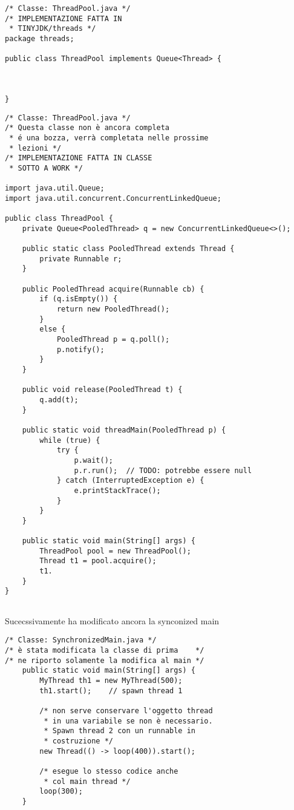\begin{lstlisting}[basicstyle=\small,]
/* Classe: ThreadPool.java */
/* IMPLEMENTAZIONE FATTA IN 
 * TINYJDK/threads */
package threads;

public class ThreadPool implements Queue<Thread> {



}

\end{lstlisting}

\begin{lstlisting}[basicstyle=\small,]
/* Classe: ThreadPool.java */
/* Questa classe non è ancora completa 
 * é una bozza, verrà completata nelle prossime
 * lezioni */
/* IMPLEMENTAZIONE FATTA IN CLASSE 
 * SOTTO A WORK */
 
import java.util.Queue;
import java.util.concurrent.ConcurrentLinkedQueue;

public class ThreadPool {
    private Queue<PooledThread> q = new ConcurrentLinkedQueue<>();

    public static class PooledThread extends Thread {
        private Runnable r;
    }

    public PooledThread acquire(Runnable cb) {
        if (q.isEmpty()) {
            return new PooledThread();
        }
        else {
            PooledThread p = q.poll();
            p.notify();
        }
    }

    public void release(PooledThread t) {
        q.add(t);
    }

    public static void threadMain(PooledThread p) {
        while (true) {
            try {
                p.wait();
                p.r.run();  // TODO: potrebbe essere null
            } catch (InterruptedException e) {
                e.printStackTrace();
            }
        }
    }

    public static void main(String[] args) {
        ThreadPool pool = new ThreadPool();
        Thread t1 = pool.acquire();
        t1.
    }
}


\end{lstlisting}




\noindent Sucecssivamente ha modificato ancora la synconized main

\begin{lstlisting}[basicstyle=\small,]
/* Classe: SynchronizedMain.java */
/* è stata modificata la classe di prima    */
/* ne riporto solamente la modifica al main */
    public static void main(String[] args) {
        MyThread th1 = new MyThread(500);
        th1.start();    // spawn thread 1

        /* non serve conservare l'oggetto thread 
         * in una variabile se non è necessario.
         * Spawn thread 2 con un runnable in
         * costruzione */
        new Thread(() -> loop(400)).start();    

        /* esegue lo stesso codice anche
         * col main thread */
        loop(300);  
    }

\end{lstlisting}










